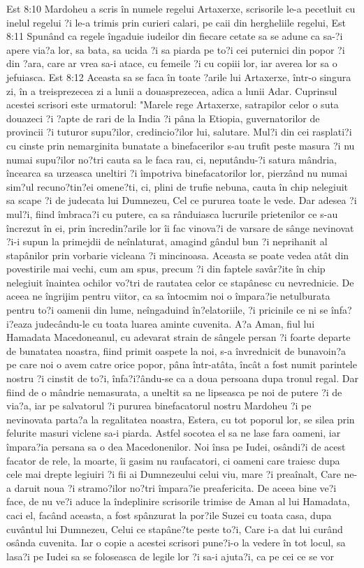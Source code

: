 Est 8:10  Mardoheu a scris în numele regelui Artaxerxe, scrisorile le-a pecetluit cu inelul regelui ?i le-a trimis prin curieri calari, pe caii din hergheliile regelui,
Est 8:11  Spunând ca regele îngaduie iudeilor din fiecare cetate sa se adune ca sa-?i apere via?a lor, sa bata, sa ucida ?i sa piarda pe to?i cei puternici din popor ?i din ?ara, care ar vrea sa-i atace, cu femeile ?i cu copiii lor, iar averea lor sa o jefuiasca.
Est 8:12  Aceasta sa se faca în toate ?arile lui Artaxerxe, într-o singura zi, în a treisprezecea zi a lunii a douasprezecea, adica a lunii Adar. Cuprinsul acestei scrisori este urmatorul: "Marele rege Artaxerxe, satrapilor celor o suta douazeci ?i ?apte de rari de la India ?i pâna la Etiopia, guvernatorilor de provincii ?i tuturor supu?ilor, credincio?ilor lui, salutare. Mul?i din cei rasplati?i cu cinste prin nemarginita bunatate a binefacerilor s-au trufit peste masura ?i nu numai supu?ilor no?tri cauta sa le faca rau, ci, neputându-?i satura mândria, încearca sa urzeasca uneltiri ?i împotriva binefacatorilor lor, pierzând nu numai sim?ul recuno?tin?ei omene?ti, ci, plini de trufie nebuna, cauta în chip nelegiuit sa scape ?i de judecata lui Dumnezeu, Cel ce pururea toate le vede. Dar adesea ?i mul?i, fiind îmbraca?i cu putere, ca sa rânduiasca lucrurile prietenilor ce s-au încrezut în ei, prin încredin?arile lor îi fac vinova?i de varsare de sânge nevinovat ?i-i supun la primejdii de neînlaturat, amagind gândul bun ?i neprihanit al stapânilor prin vorbarie vicleana ?i mincinoasa. Aceasta se poate vedea atât din povestirile mai vechi, cum am spus, precum ?i din faptele savâr?ite în chip nelegiuit înaintea ochilor vo?tri de rautatea celor ce stapânesc cu nevrednicie. De aceea ne îngrijim pentru viitor, ca sa întocmim noi o împara?ie netulburata pentru to?i oamenii din lume, neîngaduind în?elatoriile, ?i pricinile ce ni se înfa?i?eaza judecându-le cu toata luarea aminte cuvenita. A?a Aman, fiul lui Hamadata Macedoneanul, cu adevarat strain de sângele persan ?i foarte departe de bunatatea noastra, fiind primit oaspete la noi, s-a învrednicit de bunavoin?a pe care noi o avem catre orice popor, pâna într-atâta, încât a fost numit parintele nostru ?i cinstit de to?i, înfa?i?ându-se ca a doua persoana dupa tronul regal. Dar fiind de o mândrie nemasurata, a uneltit sa ne lipseasca pe noi de putere ?i de via?a, iar pe salvatorul ?i pururea binefacatorul nostru Mardoheu ?i pe nevinovata parta?a la regalitatea noastra, Estera, cu tot poporul lor, se silea prin felurite masuri viclene sa-i piarda. Astfel socotea el sa ne lase fara oameni, iar împara?ia persana sa o dea Macedonenilor. Noi însa pe Iudei, osândi?i de acest facator de rele, la moarte, îi gasim nu raufacatori, ci oameni care traiesc dupa cele mai drepte legiuiri ?i fii ai Dumnezeului celui viu, mare ?i preaînalt, Care ne-a daruit noua ?i stramo?ilor no?tri împara?ie preafericita. De aceea bine ve?i face, de nu ve?i aduce la îndeplinire scrisorile trimise de Aman al lui Hamadata, caci el, facând aceasta, a fost spânzurat la por?ile Suzei cu toata casa, dupa cuvântul lui Dumnezeu, Celui ce stapâne?te peste to?i, Care i-a dat lui curând osânda cuvenita. Iar o copie a acestei scrisori pune?i-o la vedere în tot locul, sa lasa?i pe Iudei sa se foloseasca de legile lor ?i sa-i ajuta?i, ca pe cei ce se vor 
